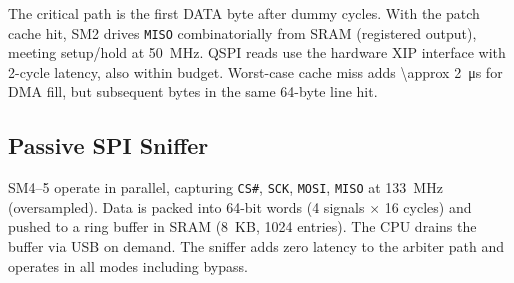 The critical path is the first DATA byte after dummy cycles. With the patch cache hit, SM2 drives \texttt{MISO} combinatorially from \ac{SRAM} (registered output), meeting setup/hold at \SI{50}{MHz}. QSPI reads use the \rp hardware XIP interface with 2-cycle latency, also within budget. Worst-case cache miss adds \SI{\approx 2}{\micro s} for DMA fill, but subsequent bytes in the same 64-byte line hit.

\subsection{Passive SPI Sniffer}
SM4--5 operate in parallel, capturing \texttt{CS\#}, \texttt{SCK}, \texttt{MOSI}, \texttt{MISO} at \SI{133}{MHz} (oversampled). Data is packed into 64-bit words (4 signals $\times$ 16 cycles) and pushed to a ring buffer in \ac{SRAM} (\SI{8}{KB}, 1024 entries). The CPU drains the buffer via USB on demand. The sniffer adds zero latency to the arbiter path and operates in all modes including bypass.